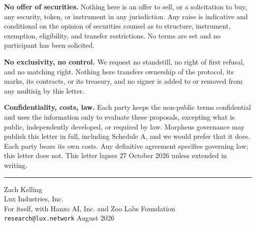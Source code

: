 \documentclass[11pt,a4paper]{article}
\begin{document}
\noindent\textbf{No offer of securities.} Nothing here is an offer to sell, or a
solicitation to buy, any security, token, or instrument in any jurisdiction. Any
raise is indicative and conditional on the opinion of securities counsel as to
structure, instrument, exemption, eligibility, and transfer restrictions. No
terms are set and no participant has been solicited.

\noindent\textbf{No exclusivity, no control.} We request no standstill, no right
of first refusal, and no matching right. Nothing here transfers ownership of the
protocol, its marks, its contracts, or its treasury, and no signer is added to or
removed from any multisig by this letter.

\noindent\textbf{Confidentiality, costs, law.} Each party keeps the non-public
terms confidential and uses the information only to evaluate these proposals,
excepting what is public, independently developed, or required by law. Morpheus
governance may publish this letter in full, including Schedule A, and we would
prefer that it does. Each party bears its own costs. Any definitive agreement
specifies governing law; this letter does not. This letter lapses 27 October 2026
unless extended in writing.

\vspace{1.6ex}
\noindent\rule{0.42\linewidth}{0.5pt}\par
\vspace{0.3ex}
\noindent Zach Kelling\\
Lux Industries, Inc.\\
For itself, with Hanzo AI, Inc. and Zoo Labs Foundation\\
\texttt{research@lux.network}  August 2026

\vspace{1.0ex}
\end{document}
